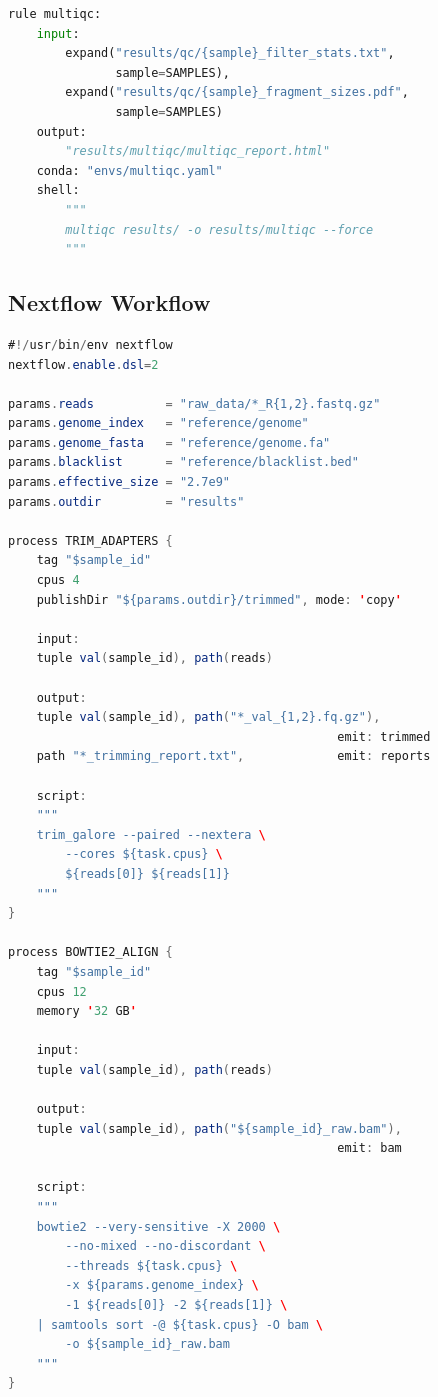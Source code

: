 \begin{lstlisting}[language=Python, caption={Snakemake workflow for ATAC-seq analysis.}, label={lst:chromatin:snakemake}]
rule multiqc:
    input:
        expand("results/qc/{sample}_filter_stats.txt",
               sample=SAMPLES),
        expand("results/qc/{sample}_fragment_sizes.pdf",
               sample=SAMPLES)
    output:
        "results/multiqc/multiqc_report.html"
    conda: "envs/multiqc.yaml"
    shell:
        """
        multiqc results/ -o results/multiqc --force
        """
\end{lstlisting}

\subsection{Nextflow Workflow}
\label{subsec:chromatin:nextflow}

\begin{lstlisting}[language=Java, caption={Nextflow DSL2 workflow for ATAC-seq analysis.}, label={lst:chromatin:nextflow}]
#!/usr/bin/env nextflow
nextflow.enable.dsl=2

params.reads          = "raw_data/*_R{1,2}.fastq.gz"
params.genome_index   = "reference/genome"
params.genome_fasta   = "reference/genome.fa"
params.blacklist      = "reference/blacklist.bed"
params.effective_size = "2.7e9"
params.outdir         = "results"

process TRIM_ADAPTERS {
    tag "$sample_id"
    cpus 4
    publishDir "${params.outdir}/trimmed", mode: 'copy'

    input:
    tuple val(sample_id), path(reads)

    output:
    tuple val(sample_id), path("*_val_{1,2}.fq.gz"),
                                              emit: trimmed
    path "*_trimming_report.txt",             emit: reports

    script:
    """
    trim_galore --paired --nextera \
        --cores ${task.cpus} \
        ${reads[0]} ${reads[1]}
    """
}

process BOWTIE2_ALIGN {
    tag "$sample_id"
    cpus 12
    memory '32 GB'

    input:
    tuple val(sample_id), path(reads)

    output:
    tuple val(sample_id), path("${sample_id}_raw.bam"),
                                              emit: bam

    script:
    """
    bowtie2 --very-sensitive -X 2000 \
        --no-mixed --no-discordant \
        --threads ${task.cpus} \
        -x ${params.genome_index} \
        -1 ${reads[0]} -2 ${reads[1]} \
    | samtools sort -@ ${task.cpus} -O bam \
        -o ${sample_id}_raw.bam
    """
}


\end{lstlisting}

